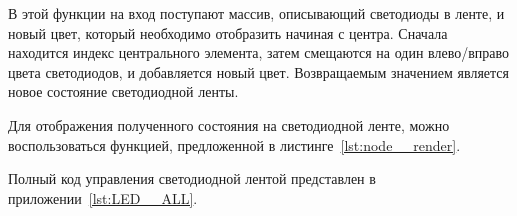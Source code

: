 В этой функции на вход поступают массив, описывающий светодиоды в ленте, и новый цвет, который необходимо отобразить начиная с центра. Сначала находится индекс центрального элемента, затем смещаются на один влево/вправо цвета светодиодов, и добавляется новый цвет. Возвращаемым значением является новое состояние светодиодной ленты.

Для отображения полученного состояния на светодиодной ленте, можно воспользоваться функцией, предложенной в листинге~\ref{lst:node__render}.



Полный код управления светодиодной лентой представлен в приложении~\ref{lst:LED__ALL}.